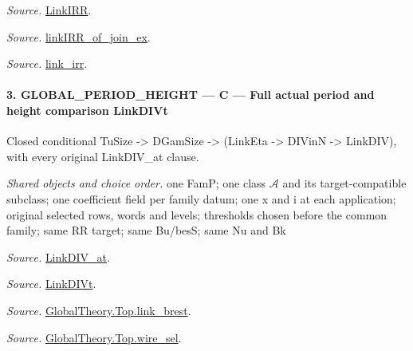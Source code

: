 \documentclass[11pt,a4paper]{article}
\numberwithin{equation}{section}
\theoremstyle{remark}\newtheorem{remark}[theorem]{Remark}
\begin{document}
\emph{Source.} \href{https://github.com/CocoSgt/riemann-hypothesis-lean/blob/7cbf7a0c32fca1badf05931879a37c3f8a2b03b4/src/Formalism/SharpRestriction/GlobalTheoremInputs.lean#L55-L58}{LinkIRR}.

\emph{Source.} \href{https://github.com/CocoSgt/riemann-hypothesis-lean/blob/7cbf7a0c32fca1badf05931879a37c3f8a2b03b4/src/Development/AbelianVarietyTheory/Proofs/GlobalInterpolation/LinkIRROfJoinEx.lean#L17-L38}{linkIRR\_\allowbreak of\_\allowbreak join\_\allowbreak ex}.

\emph{Source.} \href{https://github.com/CocoSgt/riemann-hypothesis-lean/blob/7cbf7a0c32fca1badf05931879a37c3f8a2b03b4/src/Development/AbelianVarietyTheory/Proofs/GlobalInterpolation/LinkIRROfJoinEx.lean#L143-L166}{link\_\allowbreak irr}.



\paragraph{3. GLOBAL\_\allowbreak PERIOD\_\allowbreak HEIGHT — C — Full actual period and height comparison LinkDIVt}

Closed conditional TuSize -> DGamSize -> (LinkEta -> DIVinN -> LinkDIV), with every original LinkDIV\_\allowbreak at clause.

\emph{Shared objects and choice order.} one FamP; one class $\mathcal A$ and its target-compatible subclass; one coefficient field per family datum; one x and i at each application; original selected rows, words and levels; thresholds chosen before the common family; same RR target; same Bu/besS; same Nu and Bk

\emph{Source.} \href{https://github.com/CocoSgt/riemann-hypothesis-lean/blob/7cbf7a0c32fca1badf05931879a37c3f8a2b03b4/src/Formalism/SharpRestriction/GlobalTheoremInputs.lean#L77-L90}{LinkDIV\_\allowbreak at}.

\emph{Source.} \href{https://github.com/CocoSgt/riemann-hypothesis-lean/blob/7cbf7a0c32fca1badf05931879a37c3f8a2b03b4/src/Formalism/SharpRestriction/GlobalTheoremInputs.lean#L94-L96}{LinkDIVt}.

\emph{Source.} \href{https://github.com/CocoSgt/riemann-hypothesis-lean/blob/7cbf7a0c32fca1badf05931879a37c3f8a2b03b4/src/Development/AbelianVarietyTheory/Proofs/GlobalInterpolation/LinkBrest.lean#L7-L25}{GlobalTheory.Top.link\_\allowbreak brest}.

\emph{Source.} \href{https://github.com/CocoSgt/riemann-hypothesis-lean/blob/7cbf7a0c32fca1badf05931879a37c3f8a2b03b4/src/Development/AbelianVarietyTheory/Proofs/GlobalInterpolation/WireSel.lean#L11-L41}{GlobalTheory.Top.wire\_\allowbreak sel}.
\end{document}
